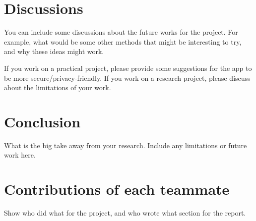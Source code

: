 \section{Discussions}
You can include some discussions about the future works for the project. For example, what would be some other methods that might be interesting to try, and why these ideas might work.

If you work on a practical project, please provide some suggestions for the app to be more secure/privacy-friendly. If you work on a research project, please discuss about the limitations of your work. 


\section{Conclusion}
\label{sec:conclusion}
What is the big take away from your research. Include any limitations or future work here. 

\section{Contributions of each teammate}
Show who did what for the project, and who wrote what section for the report. 



